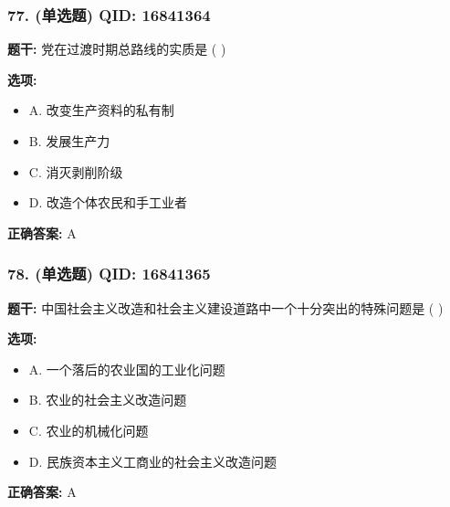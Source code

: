 \documentclass[12pt,UTF8]{ctexart}
\begin{document}
\vspace{0.3em}\hrulefill\vspace{0.7em}

\subsubsection*{77. (单选题) \small QID: 16841364}

\textbf{题干:}
党在过渡时期总路线的实质是 ( )

\textbf{选项:}
\begin{itemize}[leftmargin=*]

  \item A. 改变生产资料的私有制

  \item B. 发展生产力

  \item C. 消灭剥削阶级

  \item D. 改造个体农民和手工业者

\end{itemize}

\textbf{正确答案:}
A

\vspace{0.3em}\hrulefill\vspace{0.7em}

\subsubsection*{78. (单选题) \small QID: 16841365}

\textbf{题干:}
中国社会主义改造和社会主义建设道路中一个十分突出的特殊问题是 ( )

\textbf{选项:}
\begin{itemize}[leftmargin=*]

  \item A. 一个落后的农业国的工业化问题

  \item B. 农业的社会主义改造问题

  \item C. 农业的机械化问题

  \item D. 民族资本主义工商业的社会主义改造问题

\end{itemize}

\textbf{正确答案:}
A

\vspace{0.3em}\hrulefill\vspace{0.7em}
\end{document}

